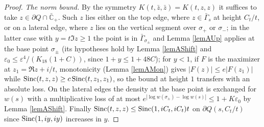 \documentclass[11pt,twoside,reqno]{amsart}
\def\pa{\partial}
\def\C{{\mathbb{C}}}
\def\e{\varepsilon}
\def\G{\Gamma}
\def\s{\sigma}
\def\S{\text{\rm Sinc}}
\theoremstyle{plain}
\numberwithin{equation}{section}
\begin{document}
\begin{proof}
{\it The norm bound.} By the symmetry $K(t,\bar z,\bar z)=K(t,z,z)$ it suffices to take $z\in\pa Q\cap\bar\C_+$. Such $z$ lies either on the top edge, where $z\in\bar\G_s$ at height $C_t/t$, or on a lateral edge, where $z$ lies on the vertical segment over $\s_+$ or $\s_-$; in the latter case with $y=t\Im z\geq1$ the point is in $\bar\G_{\s_\pm}$ and Lemma \ref{lemAUp} applies at the base point $\s_\pm$ (its hypotheses hold by Lemma \ref{lemAShift} and $\e_0\leq\e^4/(K_{18}(1+C))$, since $1+y\leq1+48C$); for $y<1$, if $F$ is the maximizer at $z_1=\Re z+i/t$, monotonicity (Lemma \ref{lemAMon}) gives $|F(z)|\leq e|F(z_1)|$ while $\S(t,z,z)\geq c\,\S(t,z_1,z_1)$, so the bound at height $1$ transfers with an absolute loss. On the lateral edges the density at the base point is exchanged for $w(s)$ with a multiplicative loss of at most $e^{|\log w(\s_\pm)-\log w(s)|}\leq1+K\e_0$ by Lemma \ref{lemAShift}. Finally $\S(t,z,z)\leq\S(1,iC_t,iC_t)t$ on $\pa Q(s,C_t/t)$ since $\S(1,iy,iy)$ increases in $y$.


\end{proof}
\end{document}
